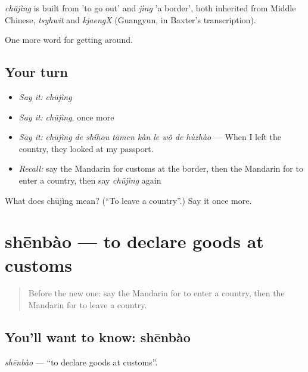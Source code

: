 \begin{cousinweb}
\emph{chūjìng} is built from  'to go out' and \emph{jìng} 'a border', both inherited from Middle Chinese, \emph{tsyhwit} and \emph{kjaengX} (Guangyun, in Baxter's transcription).
\end{cousinweb}

\begin{grammarlens}[title={What you've built}]
One more word for getting around.
\end{grammarlens}

\subsection*{Your turn}
\begin{itemize}
\raggedright
  \item \emph{Say it:} \emph{chūjìng}
  \item \emph{Say it:} \emph{chūjìng}, once more
  \item \emph{Say it:} \emph{chūjìng de shíhou tāmen kàn le wǒ de hùzhào} — When I left the country, they looked at my passport.
  \item \emph{Recall:} say the Mandarin for customs at the border, then the Mandarin for to enter a country, then say \emph{chūjìng} again
\end{itemize}

\begin{tcolorbox}[breakable,colback=teal!4,colframe=teal!35!black,title={Before you move on}]
What does chūjìng mean? (\textquotedblleft{}To leave a country\textquotedblright{}.) Say it once more.
\end{tcolorbox}
\section[shēnbào]{shēnbào — to declare goods at customs}

\label{lesson:ZH-C417-shenbao}



\begin{quote}
Before the new one: say the Mandarin for to enter a country, then the Mandarin for to leave a country.
\end{quote}

\subsection*{You'll want to know: shēnbào}
\emph{shēnbào} — \textquotedblleft{}to declare goods at customs\textquotedblright{}.

